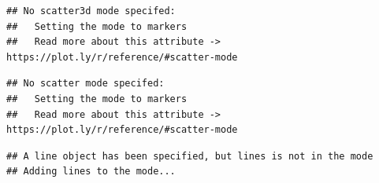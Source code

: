 \documentclass[
]{article}
\begin{document}
\begin{verbatim}
## No scatter3d mode specifed:
##   Setting the mode to markers
##   Read more about this attribute -> https://plot.ly/r/reference/#scatter-mode
\end{verbatim}

\hypertarget{htmlwidget-424ea24d6bf13cf5cd6a}{}
\begin{plotly}

\end{plotly}

\begin{verbatim}
## No scatter mode specifed:
##   Setting the mode to markers
##   Read more about this attribute -> https://plot.ly/r/reference/#scatter-mode
\end{verbatim}

\begin{verbatim}
## A line object has been specified, but lines is not in the mode
## Adding lines to the mode...
\end{verbatim}
\end{document}
